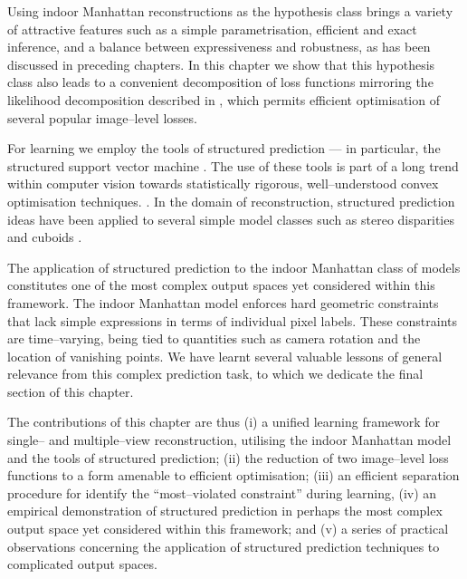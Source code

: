 Using indoor Manhattan reconstructions as the hypothesis class brings
a variety of attractive features such as a simple parametrisation,
efficient and exact inference, and a balance between expressiveness
and robustness, as has been discussed in preceding chapters. In this
chapter we show that this hypothesis class also leads to a convenient
decomposition of loss functions mirroring the likelihood decomposition
described in , which permits efficient optimisation of
several popular image--level losses.

For learning we employ the tools of structured prediction --- in
particular, the structured support vector machine
\cite{Tsochantaridis04}. The use of these tools is part of a long
trend within computer vision towards statistically rigorous,
well--understood convex optimisation
techniques. . In the domain of reconstruction,
structured prediction ideas have been applied to several simple model
classes such as stereo disparities \cite{li2008learning} and cuboids
\cite{Hedau09}.

The application of structured prediction to the indoor Manhattan class
of models constitutes one of the most complex output spaces yet
considered within this framework. The indoor Manhattan model enforces
hard geometric constraints that lack simple expressions in terms of
individual pixel labels. These constraints are time--varying,
being tied to quantities such as camera rotation and the location of
vanishing points. We have learnt several valuable lessons of general
relevance from this complex prediction task, to which we dedicate the
final section of this chapter.

The contributions of this chapter are thus (i) a unified learning
framework for single-- and multiple--view reconstruction, utilising
the indoor Manhattan model and the tools of structured prediction;
(ii) the reduction of two image--level loss functions to a form
amenable to efficient optimisation; (iii) an efficient separation
procedure for identify the ``most--violated constraint'' during
learning, (iv) an empirical demonstration of structured prediction in
perhaps the most complex output space yet considered within this
framework; and (v) a series of practical observations concerning the
application of structured prediction techniques to complicated output
spaces.

